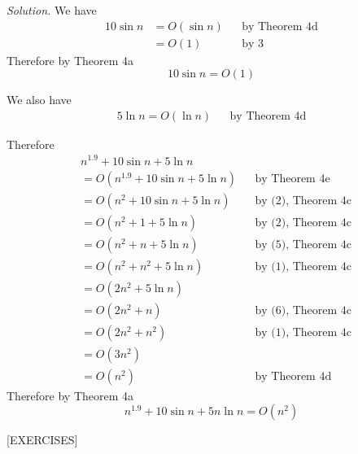 \textit{Solution.}
We have
\begin{align*}
10 \sin n 
&= O(\sin n) & & \text{by Theorem 4d} \\
&= O(1)      & & \text{by 3} 
\end{align*}
Therefore by Theorem 4a
\[
10\sin n = O(1) \tag{5}
\] 

We also have
\begin{align*}
5 \ln n = O(\ln n)  & & \text{by Theorem 4d} \tag{6}
\end{align*}

Therefore
\begin{align*}
&n^{1.9} + 10\sin n + 5 \ln n  \\
&= O(n^{1.9} + 10\sin n + 5 \ln n) & & \text{by Theorem 4e} \\
&= O(n^2 + 10\sin n + 5 \ln n)     & & \text{by (2), Theorem 4c} \\
&= O(n^2 + 1 + 5 \ln n)            & & \text{by (2), Theorem 4c}\\ 
&= O(n^2 + n + 5 \ln n)            & & \text{by (5), Theorem 4c}\\ 
&= O(n^2 + n^2 + 5 \ln n)          & & \text{by (1), Theorem 4c} \\
&= O(2n^2 + 5 \ln n)               \\
&= O(2n^2 + n)                     & & \text{by (6), Theorem 4c}\\
&= O(2n^2 + n^2)                   & & \text{by (1), Theorem 4c}\\
&= O(3n^2)                         \\
&= O(n^2)                          & & \text{by Theorem 4d}
\end{align*}
Therefore by Theorem 4a
\[
n^{1.9} + 10\sin n + 5n \ln n = O(n^2)
\]


[EXERCISES]
